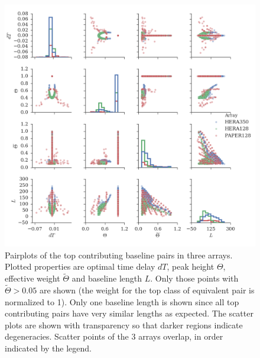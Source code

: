 \documentclass[twocolumn,apj,numberedappendix]{emulateapj}
\renewcommand\[{\begin{equation}}
\renewcommand\]{\end{equation}}
\begin{document}
\begin{widetext}
\begin{figure}[H]
\includegraphics[width=\textwidth]{pairplot}

\caption{Pairplots of the top contributing baseline pairs in three arrays. Plotted properties are optimal time delay $dT$, peak height $\Theta$, effective weight $\widetilde{\Theta}$ and baseline length $L$. Only those points with $\widetilde{\Theta}>0.05$ are shown (the weight for the top class of equivalent pair is normalized to 1). Only one baseline length is shown since all top contributing pairs have very similar lengths as expected. The scatter plots are shown with transparency so that darker regions indicate degeneracies. Scatter points of the 3 arrays overlap, in order indicated by the legend. }
\label{fig:pairplot}
\end{figure}
\end{widetext}

\pagebreak



\appendix
\end{document}
